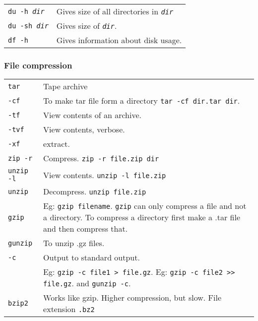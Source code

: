 \begin{tabularx}{\linewidth}{lX}
    \texttt{du -h \textit{dir}}     & Gives size of all directories in \texttt{\textit{dir}}\\
    \texttt{du -sh \textit{dir}}    & Gives size of \texttt{\textit{dir}}.\\
    \texttt{df -h}                  & Gives information about disk usage.\\
    \hline

\end{tabularx}

\subsubsection{File compression}


\begin{tabularx}{\linewidth}{lX}

    \texttt{tar}            & Tape archive\\
    \texttt{-cf}            & To make tar file form a directory \texttt{tar -cf dir.tar dir}.\\
    \texttt{-tf}            & View contents of an archive.\\
    \texttt{-tvf}           & View contents, verbose.\\
    \texttt{-xf}            & extract.\\
    \hline

    \texttt{zip -r}         & Compress. \texttt{zip -r file.zip dir}\\
    \texttt{unzip -l}       & View contents. \texttt{unzip -l file.zip}\\
    \texttt{unzip}          & Decompress. \texttt{unzip file.zip}\\
    \hline

    \texttt{gzip}           & Eg: \texttt{gzip filename}. \texttt{gzip} can only compress a file and not a directory. To compress a directory first make a .tar file and then compress that.\\
    \texttt{gunzip}         & To unzip .gz files.\\
    \texttt{-c}             & Output to standard output. \\
                            & Eg: \texttt{gzip -c file1 >  file.gz}. Eg: \texttt{gzip -c file2 >> file.gz}. and \texttt{gunzip -c}.\\
    \texttt{bzip2}          & Works like gzip. Higher compression, but slow. File extension \texttt{.bz2}\\
    \hline

\end{tabularx}


